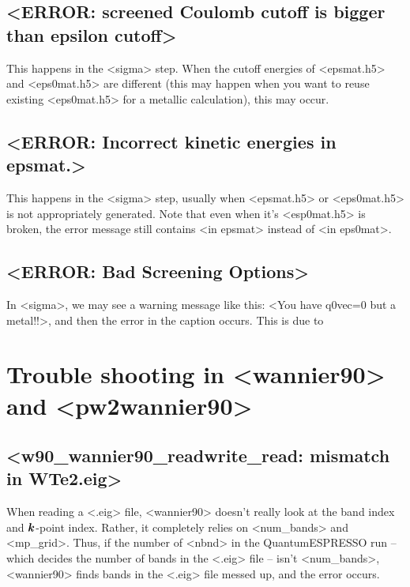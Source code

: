 \documentclass[hyperref, a4paper]{report}
\def\texttt#1{<#1>}%
\newcommand{\shortcode}[1]{\texttt{#1}}
\begin{document}
\subsection{\shortcode{ERROR: screened Coulomb cutoff is bigger than epsilon cutoff}}

This happens in the \shortcode{sigma} step.
When the cutoff energies of \shortcode{epsmat.h5} and \shortcode{eps0mat.h5} 
are different 
(this may happen when you want to reuse existing \shortcode{eps0mat.h5} for a metallic calculation),
this may occur. 

\subsection{\shortcode{ERROR: Incorrect kinetic energies in epsmat.}}

This happens in the \shortcode{sigma} step, 
usually when \shortcode{epsmat.h5} or \shortcode{eps0mat.h5} 
is not appropriately generated. 
Note that even when it's \shortcode{esp0mat.h5} is broken, 
the error message still contains \shortcode{in epsmat}
instead of \shortcode{in eps0mat}.

\subsection{\shortcode{ERROR: Bad Screening Options}}

In \shortcode{sigma}, we may see a warning message like this:
\shortcode{You have q0vec=0 but a metal!!},
and then the error in the caption occurs. 
This is due to 

\section{Trouble shooting in \shortcode{wannier90} and \shortcode{pw2wannier90}}

\subsection{\shortcode{w90_wannier90_readwrite_read: mismatch in WTe2.eig}}\label{sec:wannier.mismatch-eig}

When reading a \shortcode{.eig} file, 
\shortcode{wannier90} doesn't really look at the band index and $\vb*{k}$-point index.
Rather, it completely relies on \shortcode{num_bands} and \shortcode{mp_grid}.
Thus, if the number of \shortcode{nbnd} in the QuantumESPRESSO run -- 
which decides the number of bands in the \shortcode{.eig} file -- 
isn't \shortcode{num_bands}, 
\shortcode{wannier90} finds bands in the \shortcode{.eig} file messed up,
and the error occurs.
\end{document}
